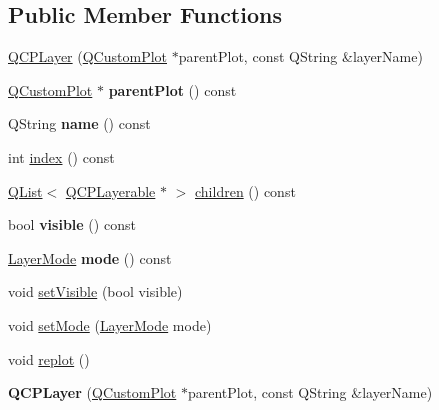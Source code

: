 \subsection*{Public Member Functions}
\begin{DoxyCompactItemize}
\item 
\hyperlink{class_q_c_p_layer_a5d0657fc86d624e5efbe930ef21af718}{Q\+C\+P\+Layer} (\hyperlink{class_q_custom_plot}{Q\+Custom\+Plot} $\ast$parent\+Plot, const Q\+String \&layer\+Name)
\item 
\mbox{\label{class_q_c_p_layer_a5520019787482e13857ebe631c27c3fa}} 
\hyperlink{class_q_custom_plot}{Q\+Custom\+Plot} $\ast$ {\bfseries parent\+Plot} () const
\item 
\mbox{\label{class_q_c_p_layer_a37806f662b50b588fb1029a14fc5ef50}} 
Q\+String {\bfseries name} () const
\item 
int \hyperlink{class_q_c_p_layer_ad322905c4700dcc7ceba63e011c730d2}{index} () const
\item 
\hyperlink{class_q_list}{Q\+List}$<$ \hyperlink{class_q_c_p_layerable}{Q\+C\+P\+Layerable} $\ast$ $>$ \hyperlink{class_q_c_p_layer_a183b90941fc78f0b136edd77c5fb6966}{children} () const
\item 
\mbox{\label{class_q_c_p_layer_ad1cc2d6b32d2abb33c7f449b964e068c}} 
bool {\bfseries visible} () const
\item 
\mbox{\label{class_q_c_p_layer_a44ae50b011b19f3dd46a38d8e2e2c1b6}} 
\hyperlink{class_q_c_p_layer_a67dcfc1590be2a1f2227c5a39bb59c7c}{Layer\+Mode} {\bfseries mode} () const
\item 
void \hyperlink{class_q_c_p_layer_ac07671f74edf6884b51a82afb2c19516}{set\+Visible} (bool visible)
\item 
void \hyperlink{class_q_c_p_layer_a938d57b04f4e4c23cedf1711f983919b}{set\+Mode} (\hyperlink{class_q_c_p_layer_a67dcfc1590be2a1f2227c5a39bb59c7c}{Layer\+Mode} mode)
\item 
void \hyperlink{class_q_c_p_layer_adefd53b6db02f470151c416f42e37180}{replot} ()
\item 
\mbox{\label{class_q_c_p_layer_a5d0657fc86d624e5efbe930ef21af718}} 
{\bfseries Q\+C\+P\+Layer} (\hyperlink{class_q_custom_plot}{Q\+Custom\+Plot} $\ast$parent\+Plot, const Q\+String \&layer\+Name)

\end{DoxyCompactItemize}
